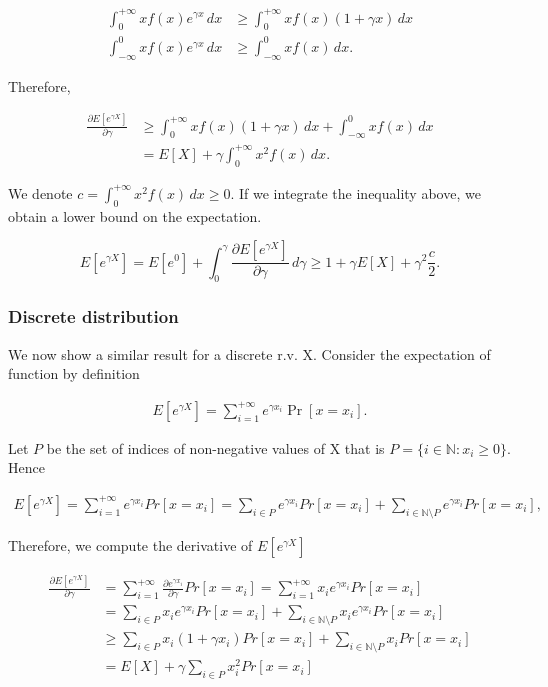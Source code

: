 \documentclass[12pt, a4paper]{article}
\theoremstyle{remark}
\newcommand{\der}[2]{\frac{\partial #1}{\partial #2}}
\begin{document}
\begin{align*}
    \int_{0}^{+\infty} x f(x) e^{\gamma x} \, dx & \geq \int_{0}^{+\infty} x f(x) (1 + \gamma x)\, dx \\
    \int_{-\infty}^{0} x f(x) e^{\gamma x} \, dx & \geq \int_{-\infty}^{0} x f(x)\, dx.
\end{align*}

Therefore,

\begin{align*}
    \frac{\partial E[e^{\gamma X}]}{\partial \gamma} & \geq  \int_{0}^{+\infty} x f(x) (1 + \gamma x)\, dx + \int_{-\infty}^{0} x f(x)\, dx \\
    & = E[X] + \gamma \int_{0}^{+\infty} x^2 f(x) \, dx.
\end{align*}

We denote $c = \int_{0}^{+\infty} x^2 f(x) \, dx \geq 0$. If we integrate the inequality above, we obtain a lower bound on the expectation.

\[
    E[e^{\gamma X}] = E[e^{0}] + \int_0^\gamma \frac{\partial E[e^{\gamma X}]}{\partial \gamma} \, d\gamma \geq 1 + \gamma E[X] + \gamma^2 \frac{c}{2}.
\]

\subsubsection*{Discrete distribution}

We now show a similar result for a discrete r.v. X. Consider the expectation of function by definition

\begin{align*}
    E[e^{\gamma X}] = \sum_{i = 1}^{+\infty} e^{\gamma x_i} \Pr[x = x_i].
\end{align*}


Let $P$ be the set of indices of non-negative values of X that is \(P = \{i \in \mathbb{N} : x_i \geq 0\}\). Hence

\begin{align*}
    E[e^{\gamma X}] = \sum_{i = 1}^{+\infty} e^{\gamma x_i} Pr[x = x_i] = \sum_{i \in P} e^{\gamma x_i} Pr[x = x_i] + \sum_{i \in \mathbb{N}\setminus P} e^{\gamma x_i} Pr[x = x_i],
\end{align*}

Therefore, we compute the derivative of \(E\left[e^{\gamma X}\right]\)

\begin{align*}
    \der{E[e^{\gamma X}]}{\gamma} & = \sum_{i = 1}^{+\infty} \frac{\partial e^{\gamma x_i}}{\partial \gamma} Pr[x = x_i] = \sum_{i = 1}^{+\infty} x_i e^{\gamma x_i} Pr[x = x_i] \\
                                  & = \sum_{i \in P} x_i e^{\gamma x_i} Pr[x = x_i] + \sum_{i \in \mathbb{N}\setminus P} x_i e^{\gamma x_i} Pr[x = x_i]                          \\
                                  & \geq \sum_{i \in P} x_i (1 + {\gamma x_i}) Pr[x = x_i] + \sum_{i \in \mathbb{N}\setminus P} x_i Pr[x = x_i]                                  \\
                                  & = E[X] + \gamma\sum_{i \in P} x_i^2 Pr[x = x_i]
\end{align*}
\end{document}
